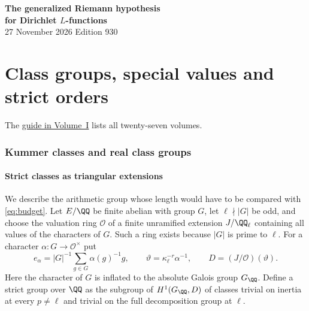 \documentclass[a4paper,11pt]{article}
\theoremstyle{definition}
\theoremstyle{remark}
\numberwithin{equation}{section}
\newcommand{\OO}{\mathcal O}
\begin{document}
\setcounter{part}{4}
\thispagestyle{plain}\begin{center}
{\LARGE\bfseries The generalized Riemann hypothesis\\[2pt]for Dirichlet \(L\)-functions}\\[6pt]
{\small 27 November 2026 \quad\textperiodcentered\quad Edition 930}\end{center}
\part{Class groups, special values and strict orders}\label{part:V}
\begin{abstract}\noindent We express strict orders in terms of Kummer classes, special values and norm maps. We use a single determinant to measure full strict orders at several twists, including classes that capitulate. For an extension ramified at two primes we prove that one decomposition group can detect every strict class. This gives full vanishing for specified character components across all twists with trivial residual character.\end{abstract}
\setcounter{section}{23}
\noindent The \hyperref[seriesguide]{guide in Volume~I} lists all twenty-seven volumes.
\begingroup\small\setlength{\parskip}{0pt}\tableofcontents\endgroup
\clearpage

\section{Kummer classes and real class groups}\label{nav:g-III-0}\label{nav:volume-V}

\subsection{Strict classes as triangular extensions}\label{nav:III-02}
We describe the arithmetic group whose length would have to be compared with \eqref{eq:budget}. Let \(E/\QQ\) be finite abelian with group \(G\), let \(\ell\nmid |G|\) be odd, and choose the valuation ring \(\OO\) of a finite unramified extension \(J/\QQ_\ell\) containing all values of the characters of \(G\). Such a ring exists because \(|G|\) is prime to \(\ell\). For a character \(\alpha:G\to\OO^\times\) put
\[
  e_\alpha=|G|^{-1}\sum_{g\in G}\alpha(g)^{-1}g,\qquad
  \vartheta=\kappa_\ell^{-r}\alpha^{-1},\qquad D=(J/\OO)(\vartheta).
\]
Here the character of \(G\) is inflated to the absolute Galois group \(G_\QQ\). Define a strict group over \(\QQ\) as the subgroup of \(H^1(G_\QQ,D)\) of classes trivial on inertia at every \(p\ne\ell\) and trivial on the full decomposition group at \(\ell\).
\end{document}

